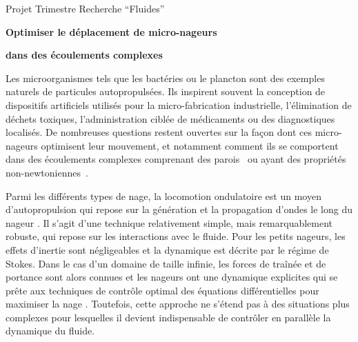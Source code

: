 \documentclass[a4paper,11pt]{article}
\begin{document}
\centerline{\large Projet Trimestre Recherche ``Fluides''}
\vspace{1cm}
\centerline{\Large \textbf{Optimiser le déplacement de micro-nageurs}}
\centerline{\Large \textbf{dans des écoulements complexes}}

\vspace{2cm}

Les microorganismes tels que les bactéries ou le plancton sont des exemples naturels de particules autopropulsées. Ils inspirent souvent la conception de dispositifs artificiels utilisés pour la micro-fabrication industrielle, l’élimination de déchets toxiques, l'administration ciblée de médica\-ments ou des diagnostiques localisés. De nombreuses questions restent ouvertes sur la façon dont ces micro-nageurs optimisent leur mouvement, et notamment comment ils se comportent dans des écoulements complexes comprenant des parois~\cite{crowdy2010two} ou ayant des propriétés non-newtoniennes~\cite{shen2011undulatory}.

Parmi les différents types de nage, la locomotion ondulatoire est un moyen d'autopropulsion qui repose sur la génération et la propagation d'ondes le long du nageur \cite{cohen2010swimming}. Il s’agit d’une technique relativement simple, mais remarquablement robuste, qui repose sur les interactions avec le fluide. Pour les petits nageurs, les effets d’inertie sont négligeables et la dynamique est décrite par le régime de Stokes. Dans le cas d’un domaine de taille infinie, les forces de traînée et de portance sont alors connues et les nageurs ont une dynamique explicites qui se prête aux techniques de contrôle optimal des équations différentielles pour maximiser la nage \cite{alouges2013self,berti2020swimming}. Toutefois, cette approche ne s’étend pas à des situations plus complexes pour lesquelles il devient indispensable de contrôler en parallèle la dynamique du fluide.
\end{document}
